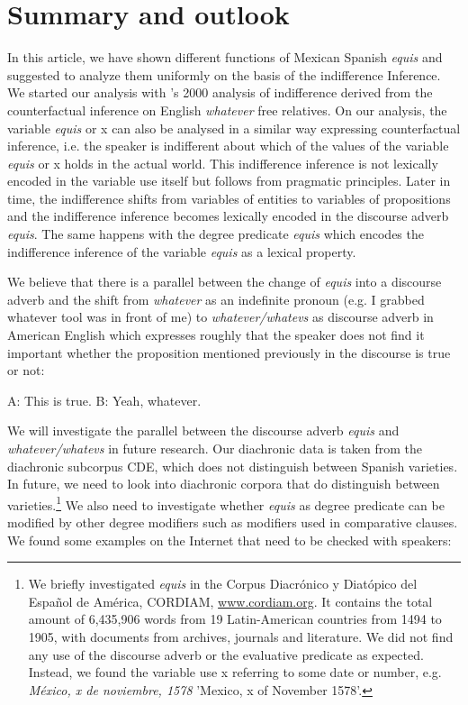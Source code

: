 \documentclass[output=paper]{langsci/langscibook}
\begin{document}
\section{Summary and outlook}\label{sec:kellert:6}
In this article, we have shown different functions of Mexican Spanish \textit{equis} and suggested to analyze them uniformly on the basis of the indifference Inference. We started our analysis with \citeauthor{Fintel2000}’s 2000 analysis of indifference derived from the counterfactual inference on English \textit{whatever} free relatives. On our analysis, the variable \textit{equis} or x can also be analysed in a similar way expressing counterfactual inference, i.e. the speaker is indifferent about which of the values of the variable \textit{equis} or x holds in the actual world. This indifference inference is not lexically encoded in the variable use itself but follows from pragmatic principles. Later in time, the indifference shifts from variables of entities to variables of propositions and the indifference inference becomes lexically encoded in the discourse adverb \textit{equis}. The same happens with the degree predicate \textit{equis} which encodes the indifference inference of the variable \textit{equis} as a lexical property.

We believe that there is a parallel between the change of \textit{equis} into a discourse adverb and the shift from \textit{whatever} as an indefinite pronoun (e.g. I grabbed whatever tool was in front of me) to \textit{whatever/whatevs} as discourse adverb in American English which expresses roughly that the speaker does not find it important whether the proposition mentioned previously in the discourse is true or not:

\ea
A: This is true. B: Yeah, whatever.
\z

We will investigate the parallel between the discourse adverb \textit{equis} and \textit{whatever/whatevs} in future research. Our diachronic data is taken from the diachronic subcorpus CDE, which does not distinguish between Spanish varieties. In future, we need to look into diachronic corpora that do distinguish between varieties.\footnote{We briefly investigated \textit{equis} in the Corpus Diacrónico y Diatópico del Español de América, CORDIAM, \href{http://www.cordiam.org}{www.cordiam.org}. It contains the total amount of 6,435,906 words from 19 Latin-American countries from 1494 to 1905, with documents from archives, journals and literature. We did not find any use of the discourse adverb or the evaluative predicate as expected. Instead, we found the variable use x referring to some date or number, e.g. \textit{México, x de noviembre, 1578} 'Mexico, x of November 1578'.}
We also need to investigate whether \textit{equis} as degree predicate can be modified by other degree modifiers such as modifiers used in comparative clauses. We found some examples on the Internet that need to be checked with speakers:
\end{document}
